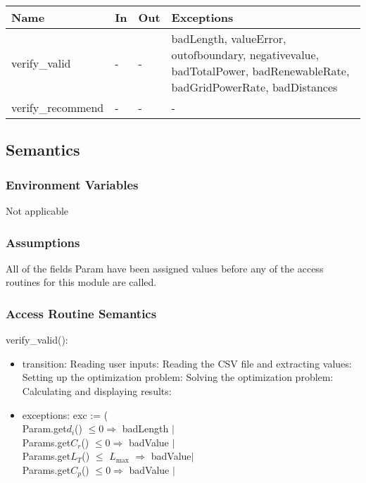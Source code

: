 \documentclass[12pt, titlepage]{article}
\begin{document}
 \begin{center}
 \begin{tabular}{p{3cm} p{1cm} p{1cm} p{9cm}}
 \hline
 \textbf{Name} & \textbf{In} & \textbf{Out} & \textbf{Exceptions} \\
 \hline
 verify\_valid & - & - & badLength, valueError, outofboundary, negativevalue,
                        badTotalPower, badRenewableRate, badGridPowerRate,
                        badDistances\\
 \hline
 verify\_recommend & - & - & - \\
 \hline
 \end{tabular}
 \end{center}

 \subsection{Semantics}

\subsubsection{Environment Variables}
Not applicable

 \subsubsection{Assumptions}

All of the fields Param have been assigned values before any of the access
 routines for this module are called.

 \subsubsection{Access Routine Semantics}

 verify\_valid(): 
 \begin{itemize}
 \item transition: Reading user inputs: Reading the CSV file and extracting values: Setting up the optimization problem: Solving the optimization problem: Calculating and displaying results:
 \item exceptions: exc := (\\
 Param.get$d_i$() $\leq 0 \Rightarrow$ badLength $|$\\
 Params.get$C_r$() $\leq 0 \Rightarrow$ badValue $|$\\
 Params.get$L_T$() $\leq$ $L_\text{max}$ $\Rightarrow$ badValue$|$\\
 Params.get$C_p$() $\leq 0 \Rightarrow$ badValue $|$\\
 \end{itemize}
\end{document}
